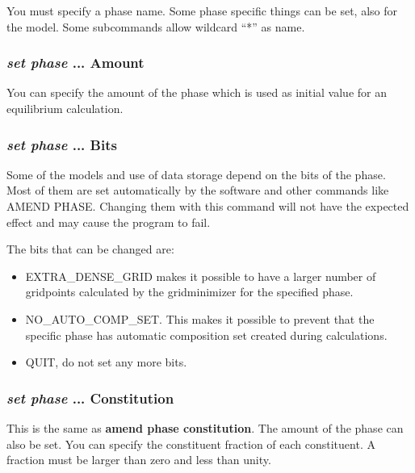 \documentclass[11pt]{article}
\begin{document}
You must specify a phase name.  Some phase specific things can be set,
also for the model.  Some subcommands allow wildcard ``*'' as name.

\hypertarget{Set phase amount}{}
\subsubsection{{\em set phase} ... Amount}

You can specify the amount of the phase which is used as initial value
for an equilibrium calculation.

\hypertarget{Set phase bits}{}
\subsubsection{{\em set phase} ... Bits}

Some of the models and use of data storage depend on the bits of the
phase.  Most of them are set automatically by the software and other
commands like AMEND PHASE.  Changing them with this command will not
have the expected effect and may cause the program to fail.

The bits that can be changed are:

\hypertarget{Extra-dense-grid}{}
\begin{itemize}
\item EXTRA\_DENSE\_GRID makes it possible to have a larger number of
  gridpoints calculated by the gridminimizer for the specified phase.

\hypertarget{No-auto-comp-set}{}
\item NO\_AUTO\_COMP\_SET.  This makes it possible to prevent that the
specific phase has automatic composition set created during
calculations.

\hypertarget{Set bit quit}{}
\item QUIT, do not set any more bits.
\end{itemize}

\subsubsection{{\em set phase} ... Constitution}
\hypertarget{Amend phase constit}{}
\hypertarget{Set phase constitution}{}

This is the same as {\bf amend phase constitution}.  The amount of the
phase can also be set.  You can specify the constituent fraction of
each constituent.  A fraction must be larger than zero and less than
unity.
\end{document}
